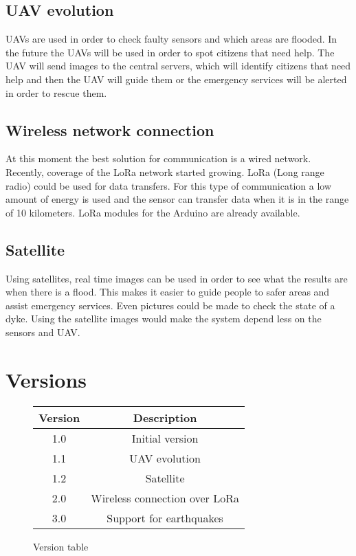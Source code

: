 \subsection{UAV evolution}
UAVs are used in order to check faulty sensors and which areas are flooded. In the future the UAVs will be used in order to spot citizens that need help. The UAV will send images to the central servers, which will identify citizens that need help and then the UAV will guide them or the emergency services will be alerted in order to rescue them. 

\subsection{Wireless network connection} 
At this moment the best solution for communication is a wired network. Recently, coverage of the LoRa network started growing. LoRa (Long range radio) could be used for data transfers. For this type of communication a low amount of energy is used and the sensor can transfer data when it is in the range of 10 kilometers.
LoRa modules for the Arduino are already available.

\subsection{Satellite}
Using satellites, real time images can be used in order to see what the results are when there is a flood. This makes it easier to guide people to safer areas and assist emergency services. Even pictures could be made to check the state of a dyke. Using the satellite images would make the system depend less on the sensors and UAV.

\section{Versions}


\begin{figure}[H]
	\centering
	\begin{tabular}{|c|c|}
		\hline \textbf{Version} & \textbf{Description} \\ 
		\hline 1.0                 & Initial version                       \\ 
		\hline 1.1                 & UAV evolution                       \\ 
		\hline 1.2					& Satellite \\
		\hline 2.0                  & Wireless connection over LoRa                       \\ 
		\hline 3.0					& Support for earthquakes \\
		\hline
	\end{tabular} 
	\label{table:versions}
	\caption{Version table}
\end{figure}

